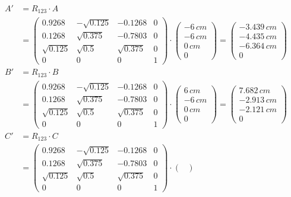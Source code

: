\begin{align*}
A' &= R_{123} \cdot A \\
   &= 
\begin{pmatrix}
0.9268 & -\sqrt{0.125} & -0.1268 & 0 \\
0.1268 & \sqrt{0.375} &  -0.7803 & 0 \\
\sqrt{0.125} & \sqrt{0.5} & \sqrt{0.375}  & 0 \\
0 & 0 & 0 & 1  
\end{pmatrix}
\cdot 
\begin{pmatrix}
- 6\,cm \\
- 6\,cm \\
0\,cm \\
0
\end{pmatrix}
=
\begin{pmatrix}
- 3.439\,cm \\
- 4.435\,cm \\
-6.364\,cm \\
0
\end{pmatrix}\\
B' &= R_{123} \cdot B \\
&= 
\begin{pmatrix}
0.9268 & -\sqrt{0.125} & -0.1268 & 0 \\
0.1268 & \sqrt{0.375} &  -0.7803 & 0 \\
\sqrt{0.125} & \sqrt{0.5} & \sqrt{0.375}  & 0 \\
0 & 0 & 0 & 1  
\end{pmatrix}
\cdot 
\begin{pmatrix}
6\,cm \\
- 6\,cm \\
0\,cm \\
0
\end{pmatrix}
=
\begin{pmatrix}
7.682\,cm \\
- 2.913\,cm \\
-2.121\,cm \\
0
\end{pmatrix}\\
C' &= R_{123} \cdot C \\
&= 
\begin{pmatrix}
0.9268 & -\sqrt{0.125} & -0.1268 & 0 \\
0.1268 & \sqrt{0.375} &  -0.7803 & 0 \\
\sqrt{0.125} & \sqrt{0.5} & \sqrt{0.375}  & 0 \\
0 & 0 & 0 & 1  
\end{pmatrix}
\cdot 
\begin{pmatrix}

\end{pmatrix}
\end{align*}
